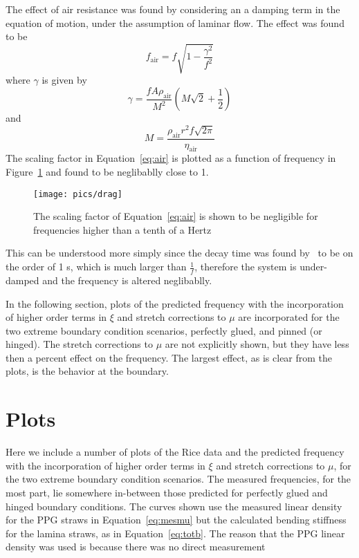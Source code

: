 \documentclass[twoside]{article}
\begin{document}
\begin{multicols}{2}
 The effect of air resistance was found by considering an a damping term in the equation of motion, under the assumption of laminar flow.  The effect was found to be
\begin{equation}
	f_\text{air} = f\sqrt{1 - \frac{\gamma^2}{f^2}}
	\label{eq:air}
\end{equation}
where $\gamma$ is given by
\begin{equation}
\gamma = \frac{f A \rho_\text{air}}{M^2} (M  \sqrt{2} +  \frac{1}{2}  )
\end{equation}
and 
\begin{equation}
	M = \frac{\rho_\text{air} r^2 f \sqrt{2\pi} }{\eta_\text{air}}
\end{equation}
The scaling factor in Equation~\ref{eq:air} is plotted as a function of frequency in Figure~\ref{fig:drag} and found to be neglibablly close to 1. 
\begin{figure}[H]
	\texttt{[image: pics/drag]}
	\caption{The scaling factor of Equation~\ref{eq:air} is shown to be negligible for frequencies higher than a tenth of a Hertz}
	\label{fig:drag}
\end{figure}
This can be understood more simply since the decay time was found by~\cite{david} to be on the order of 1 s, which is much larger than $\frac{1}{f}$, therefore the system is under-damped and the frequency is altered neglibablly. 

In the following section, plots of the predicted frequency with the incorporation of higher order terms in $\xi$ and stretch corrections to $\mu$ are incorporated for the two extreme boundary condition scenarios, perfectly glued, and pinned (or hinged).  The stretch corrections to $\mu$ are not explicitly shown, but they have less then a percent effect on the frequency. The largest effect, as is clear from the plots, is the behavior at the boundary.



\section{Plots}
Here we include a number of plots of the Rice data and the predicted frequency  with the incorporation of higher order terms in $\xi$ and stretch corrections to $\mu$, for the two extreme boundary condition scenarios.  The measured frequencies, for the most part, lie somewhere in-between those predicted for perfectly glued and hinged boundary conditions. The curves shown use the measured linear density for the PPG straws in Equation~\ref{eq:mesmu} but the calculated bending stiffness for the lamina straws, as in Equation~\ref{eq:totb}.  The reason that the PPG linear density was used is because there was no direct measurement 



\end{multicols}
\end{document}
